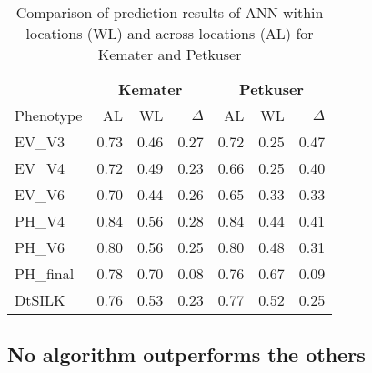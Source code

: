 \onehalfspacing
\begin{table}[H]
 \centering
 \caption[Comparison of prediction results of ANN within locations and across locations
 for Kemater and Petkuser]{Comparison of prediction results of ANN within locations (WL)
   and across locations (AL) for Kemater and Petkuser}
 \begin{tabular}{lrrr|rrr}
   \toprule
   & \multicolumn{3}{c}{\textbf{Kemater}} & \multicolumn{3}{c}{\textbf{Petkuser}}    \\
   Phenotype & AL                                   & WL   & $\Delta$ & AL   & WL   & $\Delta$ \\ 
   \midrule
   EV\_V3    & 0.73                                 & 0.46 & 0.27     & 0.72 & 0.25 & 0.47     \\ 
   EV\_V4    & 0.72                                 & 0.49 & 0.23     & 0.66 & 0.25 & 0.40     \\ 
   EV\_V6    & 0.70                                 & 0.44 & 0.26     & 0.65 & 0.33 & 0.33     \\ 
   PH\_V4    & 0.84                                 & 0.56 & 0.28     & 0.84 & 0.44 & 0.41     \\ 
   PH\_V6    & 0.80                                 & 0.56 & 0.25     & 0.80 & 0.48 & 0.31     \\ 
   PH\_final & 0.78                                 & 0.70 & 0.08     & 0.76 & 0.67 & 0.09     \\ 
   DtSILK    & 0.76                                 & 0.53 & 0.23     & 0.77 & 0.52 & 0.25     \\ 
   \bottomrule
 \end{tabular}
\end{table}
\doublespacing


\subsection{No algorithm outperforms the others}


